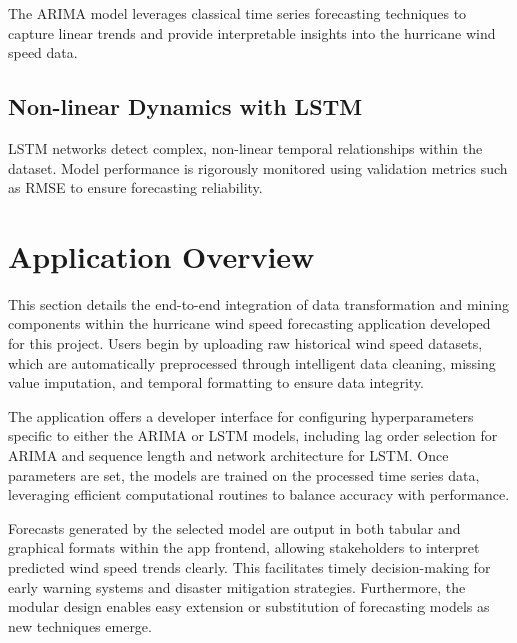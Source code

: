 The ARIMA model leverages classical time series forecasting techniques to capture linear trends and provide interpretable insights into the hurricane wind speed data.

\subsection{Non-linear Dynamics with LSTM}

LSTM networks detect complex, non-linear temporal relationships within the dataset. Model performance is rigorously monitored using validation metrics such as RMSE to ensure forecasting reliability.

\section{Application Overview}

This section details the end-to-end integration of data transformation and mining components within the hurricane wind speed forecasting application developed for this project. Users begin by uploading raw historical wind speed datasets, which are automatically preprocessed through intelligent data cleaning, missing value imputation, and temporal formatting to ensure data integrity.

The application offers a developer interface for configuring hyperparameters specific to either the ARIMA or LSTM models, including lag order selection for ARIMA and sequence length and network architecture for LSTM. Once parameters are set, the models are trained on the processed time series data, leveraging efficient computational routines to balance accuracy with performance.

Forecasts generated by the selected model are output in both tabular and graphical formats within the app frontend, allowing stakeholders to interpret predicted wind speed trends clearly. This facilitates timely decision-making for early warning systems and disaster mitigation strategies. Furthermore, the modular design enables easy extension or substitution of forecasting models as new techniques emerge.
